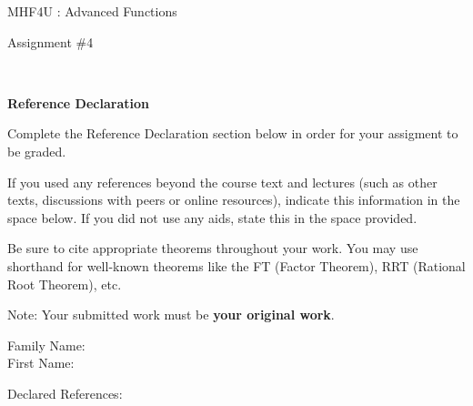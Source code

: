 \documentclass[12pt]{book}
\begin{document}
\vspace{-1.0in}\begin{center}
\Large{MHF4U :  Advanced Functions }

\Large{Assignment \#4}


\end{center}


\vspace{0.015in}\hrulefill\ 

\textbf{Reference Declaration} %

Complete the Reference Declaration section below in order for your assigment to be graded.

If you used any references beyond the course text and lectures (such as other texts, discussions with peers or online resources), indicate this information in the space below.  If you did not use any aids, state this in the space provided. 

Be sure to cite appropriate theorems throughout your work. You may use shorthand for well-known theorems like the FT (Factor Theorem), RRT (Rational Root Theorem), etc. 

Note: Your submitted work must be \textbf{your original work}. 

Family Name: \\%
First Name: %

Declared References: 


\vspace{0.015in}\hrulefill\ 

\newpage

\end{document}
